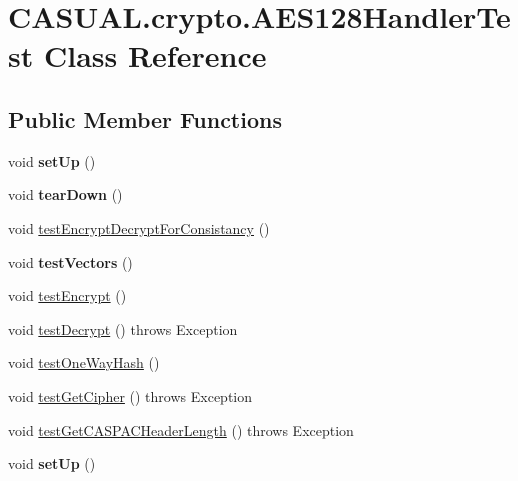 \hypertarget{class_c_a_s_u_a_l_1_1crypto_1_1_a_e_s128_handler_test}{\section{C\-A\-S\-U\-A\-L.\-crypto.\-A\-E\-S128\-Handler\-Test Class Reference}
\label{class_c_a_s_u_a_l_1_1crypto_1_1_a_e_s128_handler_test}
}
\subsection*{Public Member Functions}
\begin{DoxyCompactItemize}
\item 
\hypertarget{class_c_a_s_u_a_l_1_1crypto_1_1_a_e_s128_handler_test_a0904bd896848358b77288a11c04f9edd}{void {\bfseries set\-Up} ()}\label{class_c_a_s_u_a_l_1_1crypto_1_1_a_e_s128_handler_test_a0904bd896848358b77288a11c04f9edd}

\item 
\hypertarget{class_c_a_s_u_a_l_1_1crypto_1_1_a_e_s128_handler_test_ab84b3869bceb7cc35617c90529c21f7e}{void {\bfseries tear\-Down} ()}\label{class_c_a_s_u_a_l_1_1crypto_1_1_a_e_s128_handler_test_ab84b3869bceb7cc35617c90529c21f7e}

\item 
void \hyperlink{class_c_a_s_u_a_l_1_1crypto_1_1_a_e_s128_handler_test_a73233834a3d1d94d9b09e8497c908d53}{test\-Encrypt\-Decrypt\-For\-Consistancy} ()
\item 
\hypertarget{class_c_a_s_u_a_l_1_1crypto_1_1_a_e_s128_handler_test_af89670b934aadb3d920945c3642002a2}{void {\bfseries test\-Vectors} ()}\label{class_c_a_s_u_a_l_1_1crypto_1_1_a_e_s128_handler_test_af89670b934aadb3d920945c3642002a2}

\item 
void \hyperlink{class_c_a_s_u_a_l_1_1crypto_1_1_a_e_s128_handler_test_a7e236edcae27999247ca0d8917c3ba67}{test\-Encrypt} ()
\item 
void \hyperlink{class_c_a_s_u_a_l_1_1crypto_1_1_a_e_s128_handler_test_a388ea85acdd8e0e7f89bae2f41825754}{test\-Decrypt} ()  throws Exception 
\item 
void \hyperlink{class_c_a_s_u_a_l_1_1crypto_1_1_a_e_s128_handler_test_a7f52bdaa3a3480152bf09d623f0b3ef7}{test\-One\-Way\-Hash} ()
\item 
void \hyperlink{class_c_a_s_u_a_l_1_1crypto_1_1_a_e_s128_handler_test_add6d05ba482fa72052b9a8a2ddda9e1f}{test\-Get\-Cipher} ()  throws Exception 
\item 
void \hyperlink{class_c_a_s_u_a_l_1_1crypto_1_1_a_e_s128_handler_test_ab15c6d7c958dc99906168f6434cd4bc4}{test\-Get\-C\-A\-S\-P\-A\-C\-Header\-Length} ()  throws Exception 
\item 
\hypertarget{class_c_a_s_u_a_l_1_1crypto_1_1_a_e_s128_handler_test_a0904bd896848358b77288a11c04f9edd}{void {\bfseries set\-Up} ()}\label{class_c_a_s_u_a_l_1_1crypto_1_1_a_e_s128_handler_test_a0904bd896848358b77288a11c04f9edd}


\end{DoxyCompactItemize}
